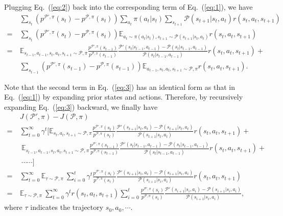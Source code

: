 \documentclass[letterpaper]{article} %
\def\E{{\mathbb{E}}}
\def\P{{\mathcal{P}}}
\begin{document}
Plugging Eq.~(\ref{eq:2}) back into the corresponding term of Eq.~(\ref{eq:1}), we have
{\small
\begin{align}
&\sum_{s_t}\left(p^{\P',\pi}(s_t)-p^{\P,\pi}(s_t)\right)
\sum_{a_t}\pi(a_t|s_t)
\sum_{s_{t+1}}\P(s_{t+1}|s_t,a_t)
r(s_t,a_t,s_{t+1})
\nonumber
\\
=\ &\sum_{s_t}\left(p^{\P',\pi}(s_t)-p^{\P,\pi}(s_t)\right)
\E_{a_t\sim\pi(a_t|s_t),s_{t+1}\sim\P(s_{t+1}|s_t,a_t)}
r(s_t,a_t,s_{t+1})
\nonumber
\\
=\ &\E_{s_{t-1},a_{t-1},s_t,a_t,s_{t+1}\sim\P,\pi}
\frac{p^{\P',\pi}(s_{t-1})}{p^{\P,\pi}(s_{t-1})}
\frac{\P'(s_t|s_{t-1},a_{t-1})-\P(s_t|s_{t-1},a_{t-1})}{\P(s_t|s_{t-1},a_{t-1})}
r(s_t,a_t,s_{t+1})+
\nonumber
\\
&\sum_{s_{t-1}}\left(p^{\P',\pi}(s_{t-1})-p^{\P,\pi}(s_{t-1})\right)\E_{a_{t-1},s_t,a_t,s_{t+1}\sim\P,\pi}
r(s_t,a_t,s_{t+1}).
\label{eq:3}
\end{align}
}\noindent

Note that the second term in Eq.~(\ref{eq:3}) has an identical form as that in Eq.~(\ref{eq:1}) by expanding prior states and actions. Therefore, by recursively expanding Eq.~(\ref{eq:3}) backward, we finally have
{\small
\begin{align}
&J(\P',\pi)-J(\P,\pi)
\nonumber
\\
=\ &\sum_{t=0}^{\infty}\gamma^t\bigg[\E_{s_t,a_t,s_{t+1}\sim\P,\pi}
\frac{p^{\P',\pi}(s_t)}{p^{\P,\pi}(s_t)}\frac{\P'(s_{t+1}|s_t,a_t)-\P(s_{t+1}|s_t,a_t)}{\P(s_{t+1}|s_t,a_t)}r(s_t,a_t,s_{t+1})+
\nonumber
\\
&\ \E_{s_{t-1},a_{t-1},s_t,a_t,s_{t+1}\sim\P,\pi}
\frac{p^{\P',\pi}(s_{t-1})}{p^{\P,\pi}(s_{t-1})}
\frac{\P'(s_t|s_{t-1},a_{t-1})-\P(s_t|s_{t-1},a_{t-1})}{\P(s_t|s_{t-1},a_{t-1})}
r(s_t,a_t,s_{t+1})+
\nonumber
\\
&\ \cdots\cdots\bigg]
\nonumber
\\
=\ &\sum_{t=0}^{\infty}\E_{\tau\sim\P,\pi}\ 
\sum_{i=0}^t\gamma^t
\frac{p^{\P',\pi}(s_i)}{p^{\P,\pi}(s_i)}
\frac{\P'(s_{i+1}|s_i,a_i)-\P(s_{i+1}|s_i,a_i)}{\P(s_{i+1}|s_i,a_i)}
r(s_t,a_t,s_{t+1})
\nonumber
\\
=\ &\E_{\tau\sim\P,\pi}\ 
\sum_{t=0}^{\infty}
\gamma^t r(s_t,a_t,s_{t+1})
\sum_{i=0}^t
\frac{p^{\P',\pi}(s_i)}{p^{\P,\pi}(s_i)}
\frac{\P'(s_{i+1}|s_i,a_i)-\P(s_{i+1}|s_i,a_i)}{\P(s_{i+1}|s_i,a_i)},
\label{eq:4}
\end{align}
}\noindent
where $\tau$ indicates the trajectory $s_0,a_0,\cdots$.
\end{document}
